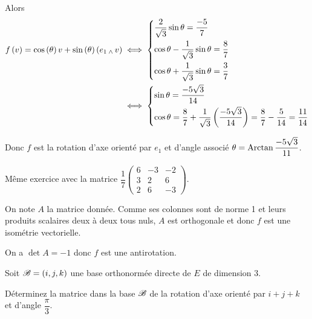 \begin{corr}
Alors \[\begin{aligned}
f\left(v\right)=\cos\left(\theta\right)v+\sin\left(\theta\right)\left(e_1\operatorname{_\wedge} v\right)&\iff\begin{dcases}
\dfrac{2}{\sqrt{3}}\sin\theta=\dfrac{-5}{7} \\
\cos\theta-\dfrac{1}{\sqrt{3}}\sin\theta=\dfrac{8}{7} \\
\cos\theta+\dfrac{1}{\sqrt{3}}\sin\theta=\dfrac{3}{7}
\end{dcases} \\
&\iff\begin{dcases}
\sin\theta=\dfrac{-5\sqrt{3}}{14} \\
\cos\theta=\dfrac{8}{7}+\dfrac{1}{\sqrt{3}}\left(\dfrac{-5\sqrt{3}}{14}\right)=\dfrac{8}{7}-\dfrac{5}{14}=\dfrac{11}{14}
\end{dcases}
\end{aligned}\]

Donc \(f\) est la rotation d'axe orienté par \(e_1\) et d'angle associé \(\theta=\operatorname{Arctan}\dfrac{-5\sqrt{3}}{11}\).
\end{corr}

\begin{exo}
Même exercice avec la matrice \(\dfrac{1}{7}\begin{pmatrix}
6 & -3 & -2 \\
3 & 2 & 6 \\
2 & 6 & -3
\end{pmatrix}\).
\end{exo}

\begin{corr}
On note \(A\) la matrice donnée. Comme ses colonnes sont de norme 1 et leurs produits scalaires deux à deux tous nuls, \(A\) est orthogonale et donc \(f\) est une isométrie vectorielle.

On a \(\det A=-1\) donc \(f\) est une antirotation.
\end{corr}

\begin{exo}
Soit \(\mathscr{B}=\left(i,j,k\right)\) une base orthonormée directe de \(E\) de dimension \(3\).

Déterminez la matrice dans la base \(\mathscr{B}\) de la rotation d'axe orienté par \(i+j+k\) et d'angle \(\dfrac{\pi}{3}\).
\end{exo}

